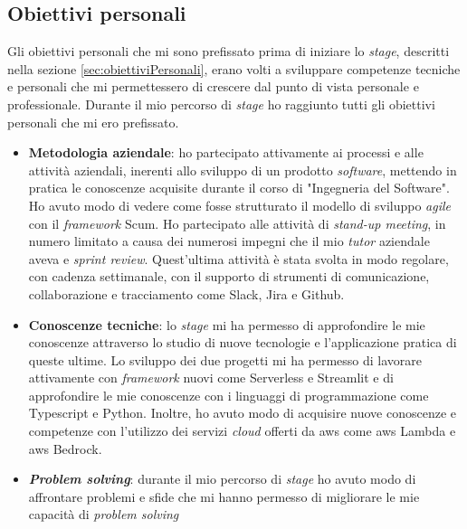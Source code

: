 \subsection{Obiettivi personali}
Gli obiettivi personali che mi sono prefissato prima di iniziare lo \textit{stage}, descritti nella sezione \ref{sec:obiettiviPersonali}, erano volti a sviluppare competenze tecniche e personali che mi permettessero di crescere dal punto di vista personale e professionale.
Durante il mio percorso di \textit{stage} ho raggiunto tutti gli obiettivi personali che mi ero prefissato.
\begin{itemize}
    \item \textbf{Metodologia aziendale}: ho partecipato attivamente ai processi e alle attività aziendali, inerenti allo sviluppo di un prodotto \textit{software}, mettendo in pratica le conoscenze acquisite durante il corso di "Ingegneria del Software". Ho avuto modo di vedere come fosse strutturato il modello di sviluppo \textit{agile} con il \textit{framework} Scum. Ho partecipato alle attività di \textit{stand-up meeting}, in numero limitato a causa  dei numerosi impegni che il mio \textit{tutor} aziendale aveva e \textit{sprint review}. Quest'ultima attività è stata svolta in modo regolare, con cadenza settimanale, con il supporto di strumenti di comunicazione, collaborazione e tracciamento come Slack, Jira e Github. 
    \item \textbf{Conoscenze tecniche}: lo \textit{stage} mi ha permesso di approfondire le mie conoscenze attraverso lo studio di nuove tecnologie e l'applicazione pratica di queste ultime. Lo sviluppo dei due progetti mi ha permesso di lavorare attivamente con \textit{framework} nuovi come Serverless e Streamlit e di approfondire le mie conoscenze con i linguaggi di programmazione come Typescript e Python. Inoltre, ho avuto modo di acquisire nuove conoscenze e competenze con l'utilizzo dei servizi \textit{cloud} offerti da \gls{aws} come \gls{aws} Lambda e \gls{aws} Bedrock.
    \item \textbf{\textit{Problem solving}}: durante il mio percorso di \textit{stage} ho avuto modo di affrontare problemi e sfide che mi hanno permesso di migliorare le mie capacità di \textit{problem solving}
\end{itemize}

